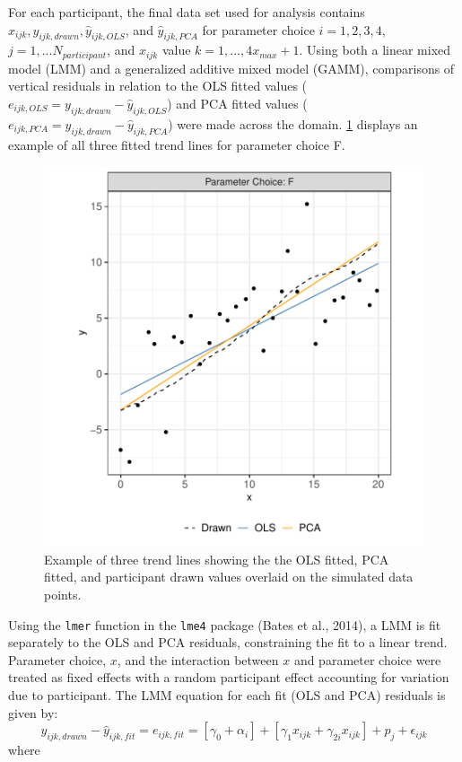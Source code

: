 \documentclass[print]{nuthesis}
\begin{document}
For each participant, the final data set used for analysis contains \(x_{ijk}, y_{ijk,drawn}, \hat y_{ijk,OLS}\), and \(\hat y_{ijk,PCA}\) for parameter choice \(i = 1,2,3,4\), \(j = 1,...N_{participant}\), and \(x_{ijk}\) value \(k = 1, ...,4 x_{max} + 1\).
Using both a linear mixed model (LMM) and a generalized additive mixed model (GAMM), comparisons of vertical residuals in relation to the OLS fitted values (\(e_{ijk,OLS} = y_{ijk,drawn} - \hat y_{ijk,OLS}\)) and PCA fitted values (\(e_{ijk,PCA} = y_{ijk,drawn} - \hat y_{ijk,PCA}\)) were made across the domain.
\cref{fig:eyefitting-example-plot} displays an example of all three fitted trend lines for parameter choice F.

\begin{figure}[tbp]

{\centering \includegraphics[width=0.7\linewidth,]{thesis_files/figure-latex/eyefitting-example-plot-1} 

}

\caption[Eye Fitting Straight Lines in the Modern Era Feedback Data Example]{Example of three trend lines showing the the OLS fitted, PCA fitted, and participant drawn values overlaid on the simulated data points.}\label{fig:eyefitting-example-plot}
\end{figure}

Using the \texttt{lmer} function in the \texttt{lme4} package (Bates et al., 2014), a LMM is fit separately to the OLS and PCA residuals, constraining the fit to a linear trend.
Parameter choice, \(x\), and the interaction between \(x\) and parameter choice were treated as fixed effects with a random participant effect accounting for variation due to participant.
The LMM equation for each fit (OLS and PCA) residuals is given by:
\begin{equation}
y_{ijk,drawn} - \hat y_{ijk,fit} = e_{ijk,fit} = \left[\gamma_0 + \alpha_i\right] + \left[\gamma_{1} x_{ijk} + \gamma_{2i} x_{ijk}\right] + p_{j} + \epsilon_{ijk}
\end{equation}
\noindent where
\end{document}
